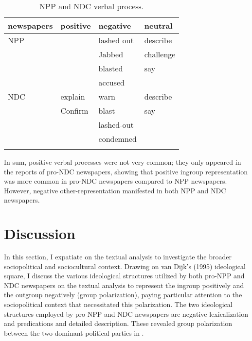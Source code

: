 \documentclass[output=paper,modfonts]{langscibook}
\begin{document}
\begin{table}
\begin{tabularx}{\textwidth}{XXXX}
 \lsptoprule
newspapers  &    positive    &  negative   &   neutral\\
\midrule
NPP         &          & lashed out     & describe   \\
 &  & 			Jabbed  &    challenge\\
 &  &             blasted   &   say\\
 &  &             accused           & \\
 \tablevspace
NDC  &       explain  &     warn       &  describe\\
 &       Confirm   &   blast   &     say\\
 &  &             lashed-out\\
 &  &             condemned\\  
 \lspbottomrule
\end{tabularx}
\caption{NPP and NDC verbal process.}
\label{tab:1}
\end{table} 

In sum, positive verbal processes were not very common; they only appeared in the reports of pro-NDC newspapers, showing that positive ingroup representation was more common in pro-NDC newspapers compared to NPP newspapers. However, negative other-representation manifested in both NPP and NDC newspapers.

\section{Discussion}\label{sec:ofori:4}

In this section, I expatiate on the textual analysis to investigate the broader sociopolitical and sociocultural context. Drawing on van Dijk’s (1995) ideological square, I discuss the various ideological structures utilized by both pro-NPP and NDC newspapers on the textual analysis to represent the ingroup positively and the outgroup negatively (group polarization), paying particular attention to the sociopolitical context that necessitated this polarization. The two ideological structures employed by pro-NPP and NDC newspapers are negative lexicalization and predications and detailed description. These revealed group polarization between the two dominant political parties in .
\end{document}
